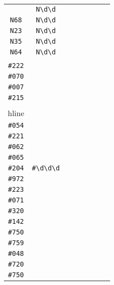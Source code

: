 \begin{longtable}{cccccccc}
\begin{tabular}{ll}
    \verb|N74| & \verb|N\d\d|\\
\verb|N68| & \verb|N\d\d|\\
\verb|N23| & \verb|N\d\d|\\
\verb|N35| & \verb|N\d\d|\\
\verb|N64| & \verb|N\d\d|
\end{tabular}
\\\midrule 
\begin{tabular}{l}
    \verb|#217|\\
\verb|#222|\\
\verb|#070|\\
\verb|#007|\\
\verb|#215|\\
\\hline\\
\verb|#054|\\
\verb|#221|\\
\verb|#062|\\
\verb|#065|\\
\verb|#204|
\end{tabular}

&
\verb|#\d\d\d|
&

\begin{tabular}{l}
    \verb|#\d\d\d|\\
\verb|#972|\\
\verb|#223|\\
\verb|#071|\\
\verb|#320|\\
\verb|#142|
\end{tabular}

&

\begin{tabular}{l}
    \verb|#\d\d\d|\\
\verb|#750|\\
\verb|#759|\\
\verb|#048|\\
\verb|#720|\\
\verb|#750|
\end{tabular}

&


\end{longtable}
